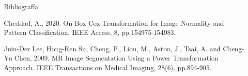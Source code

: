\documentclass{beamer}
\begin{document}
\begin{frame}{Bibliografía}
    \begin{thebibliography}{9}
    Cheddad, A., 2020. On Box-Cox Transformation for Image Normality and Pattern Classification. IEEE Access, 8, pp.154975-154983.
    
    Juin-Der Lee, Hong-Ren Su, Cheng, P., Liou, M., Aston, J., Tsai, A. and Cheng-Yu Chen, 2009. MR Image Segmentation Using a Power Transformation Approach. IEEE Transactions on Medical Imaging, 28(6), pp.894-905.
    
    \end{thebibliography}
\end{frame}
\end{document}
